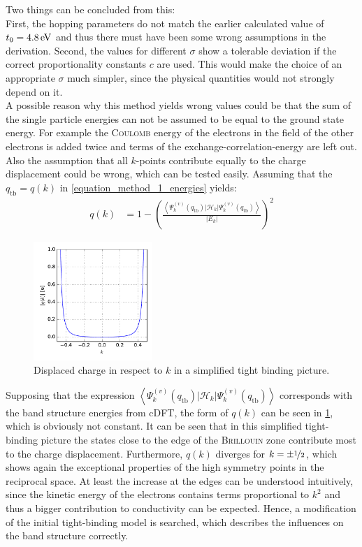 Two things can be concluded from this:\\
First, the hopping parameters do not match the earlier calculated value of $t_0 = \unit[4.8]{eV}$ and thus there must have been some wrong assumptions in the derivation. Second, the values for different $\sigma$ show a tolerable deviation if the correct proportionality constants $c$ are used. This would make the choice of an appropriate $\sigma$ much simpler, since the physical quantities would not strongly depend on it.\\
A possible reason why this method yields wrong values could be that the sum of the single particle energies can not be assumed to be equal to the ground state energy. For example the \textsc{Coulomb} energy of the electrons in the field of the other electrons is added twice and terms of the exchange-correlation-energy are left out. Also the assumption that all $k$-points contribute equally to the charge displacement could be wrong, which can be tested easily. Assuming that the $q_\text{tb} = q(k)$ in \cref{equation_method_1_energies} yields:
\begin{align}
	q(k) &= 1 - \left(\frac{\left\langle\Psi_k^{(v)}(q_\text{tb})\Big|\mathcal{H}_{k}\Big|\Psi_k^{(v)}(q_\text{tb})\right\rangle}{\left|E_k\right|}\right)^{2}
\end{align}
\begin{figure}
	\centering
	\includegraphics[width = 0.4\textwidth]{Images/Hydrogen/charging/charge_vs_k}
	\caption{Displaced charge in respect to $k$ in a simplified tight binding picture.}
	\label{image_tight_binding_q_vs_k}
\end{figure}
Supposing that the expression $\left\langle\Psi_k^{(v)}(q_\text{tb})\Big|\mathcal{H}_{k}\Big|\Psi_k^{(v)}(q_\text{tb})\right\rangle$ corresponds with the band structure energies from cDFT, the form of $q(k)$ can be seen in \cref{image_tight_binding_q_vs_k}, which is obviously not constant. It can be seen that in this simplified tight-binding picture the states close to the edge of the \textsc{Brillouin} zone contribute most to the charge displacement. Furthermore, $q(k)$ diverges for $k = \pm \nicefrac{1}{2}$, which shows again the exceptional properties of the high symmetry points in the reciprocal space. At least the increase at the edges can be understood intuitively, since the kinetic energy of the electrons contains terms proportional to $k^2$ and thus a bigger contribution to conductivity can be expected. Hence, a modification of the initial tight-binding model is searched, which describes the influences on the band structure correctly.\\

